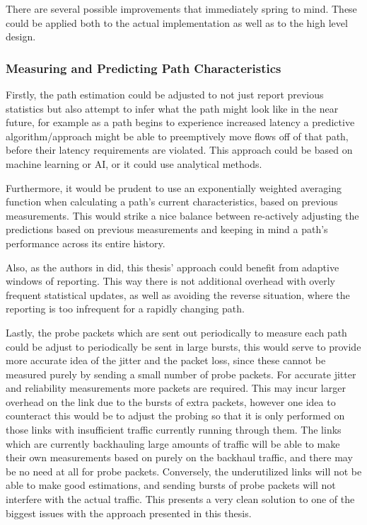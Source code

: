 There are several possible improvements that immediately spring to mind. These could be applied both to the actual implementation as well as to the high level design.

\subsubsection{Measuring and Predicting Path Characteristics}
Firstly, the path estimation could be adjusted to not just report previous statistics but also attempt to infer what the path might look like in the near future, for example as a path begins to experience increased latency a predictive algorithm/approach might be able to preemptively move flows off of that path, before their latency requirements are violated. This approach could be based on machine learning or AI, or it could use analytical methods.

Furthermore, it would be prudent to use an exponentially weighted averaging function when calculating a path's current characteristics, based on previous measurements. This would strike a nice balance between re-actively adjusting the predictions based on previous measurements and keeping in mind a path's performance across its entire history.

Also, as the authors in \cite{adaptive} did, this thesis' approach could benefit from adaptive windows of reporting. This way there is not additional overhead with overly frequent statistical updates, as well as avoiding the reverse situation, where the reporting is too infrequent for a rapidly changing path.

Lastly, the probe packets which are sent out periodically to measure each path could be adjust to periodically be sent in large bursts, this would serve to provide more accurate idea of the jitter and the packet loss, since these cannot be measured purely by sending a small number of probe packets. For accurate jitter and reliability measurements more packets are required. This may incur larger overhead on the link due to the bursts of extra packets, however one idea to counteract this would be to adjust the probing so that it is only performed on those links with insufficient traffic currently running through them. The links which are currently backhauling large amounts of traffic will be able to make their own measurements based on purely on the backhaul traffic, and there may be no need at all for probe packets. Conversely, the underutilized links will not be able to make good estimations, and sending bursts of probe packets will not interfere with the actual traffic. This presents a very clean solution to one of the biggest issues with the approach presented in this thesis.

